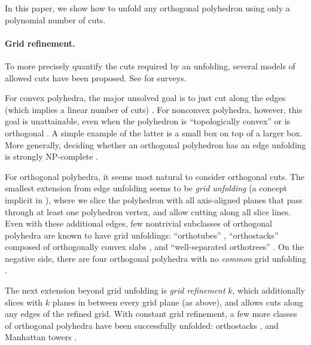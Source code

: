 \documentclass[11pt]{article}
\begin{document}
In this paper, we show how to unfold any orthogonal polyhedron
using only a polynomial number of cuts.

\paragraph{Grid refinement.}
To more precisely quantify the cuts required by an unfolding,
several models of allowed cuts have been proposed.
See \cite{Demaine-O'Rourke-2005,Demaine-O'Rourke-2007,O'Rourke-2008-orthosurvey}
for surveys.

For convex polyhedra, the major unsolved goal is to just cut along the edges
(which implies a linear number of cuts) \cite[ch.~22]{Demaine-O'Rourke-2007}.
For nonconvex polyhedra, however, this goal is unattainable, even
when the polyhedron is ``topologically convex''
\cite{Bern-Demaine-Eppstein-Kuo-Mantler-Snoeyink-2003}
or is orthogonal
\cite{Biedl-Demaine-Demaine-Lubiw-Overmars-O'Rourke-Robbins-Whitesides-1998}.
A simple example of the latter is a small box on top of a larger box.
More generally, deciding whether an orthogonal polyhedron has an edge
unfolding is strongly NP-complete \cite{Abel-Demaine-2011}.

For orthogonal polyhedra, it seems most natural to consider orthogonal cuts.
The smallest extension from edge unfolding seems to be \emph{grid unfolding}
(a concept implicit in
\cite{Biedl-Demaine-Demaine-Lubiw-Overmars-O'Rourke-Robbins-Whitesides-1998}),
where we slice the polyhedron with all axis-aligned planes that pass through
at least one polyhedron vertex, and allow cutting along all slice lines.
Even with these additional edges, few nontrivial subclasses of
orthogonal polyhedra are known to have grid unfoldings: ``orthotubes''
\cite{Biedl-Demaine-Demaine-Lubiw-Overmars-O'Rourke-Robbins-Whitesides-1998},
``orthostacks'' composed of orthogonally convex slabs
\cite{Damian-Meijer-2004-orthostacks}, and
``well-separated orthotrees''
\cite{Damian-Flatland-Meijer-O'Rourke-2005-orthotrees}.
On the negative side, there are four orthogonal polyhedra with no
\emph{common} grid unfolding
\cite{Aloupis-Bose-Collette-Demaine-Demaine-Douieb-Dujmovic-Iacono-Langerman-Morin-2010}.

The next extension beyond grid unfolding is \emph{grid refinement} $k$,
which additionally slices with $k$ planes in between every grid plane
(as above), and allows cuts along any edges of the refined grid.
With constant grid refinement, a few more classes of orthogonal polyhedra
have been successfully unfolded: orthostacks
\cite{Biedl-Demaine-Demaine-Lubiw-Overmars-O'Rourke-Robbins-Whitesides-1998},
and Manhattan towers \cite{Damian-Flatland-O'Rourke-2008-manhattan}.
\end{document}
